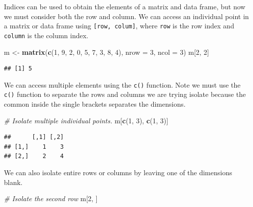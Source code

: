 \documentclass[
]{book}
\newenvironment{Shaded}{\begin{snugshade}}{\end{snugshade}}
\newcommand{\CommentTok}[1]{\textcolor[rgb]{0.56,0.35,0.01}{\textit{#1}}}
\newcommand{\DataTypeTok}[1]{\textcolor[rgb]{0.13,0.29,0.53}{#1}}
\newcommand{\DecValTok}[1]{\textcolor[rgb]{0.00,0.00,0.81}{#1}}
\newcommand{\KeywordTok}[1]{\textcolor[rgb]{0.13,0.29,0.53}{\textbf{#1}}}
\newcommand{\NormalTok}[1]{#1}
\newcommand{\StringTok}[1]{\textcolor[rgb]{0.31,0.60,0.02}{#1}}
\begin{document}
Indices can be used to obtain the elements of a matrix and data frame, but now we must consider both the row and column. We can access an individual point in a matrix or data frame using \texttt{{[}row,\ colum{]}}, where \texttt{row} is the row index and \texttt{column} is the column index.

\begin{Shaded}
\begin{Highlighting}[]
\NormalTok{m <-}\StringTok{ }\KeywordTok{matrix}\NormalTok{(}\KeywordTok{c}\NormalTok{(}\DecValTok{1}\NormalTok{, }\DecValTok{9}\NormalTok{, }\DecValTok{2}\NormalTok{, }\DecValTok{0}\NormalTok{, }\DecValTok{5}\NormalTok{, }\DecValTok{7}\NormalTok{, }\DecValTok{3}\NormalTok{, }\DecValTok{8}\NormalTok{, }\DecValTok{4}\NormalTok{), }\DataTypeTok{nrow =} \DecValTok{3}\NormalTok{, }\DataTypeTok{ncol =} \DecValTok{3}\NormalTok{)}
\NormalTok{m[}\DecValTok{2}\NormalTok{, }\DecValTok{2}\NormalTok{]}
\end{Highlighting}
\end{Shaded}

\begin{verbatim}
## [1] 5
\end{verbatim}

We can access multiple elements using the \texttt{c()} function. Note we must use the \texttt{c()} function to separate the rows and columns we are trying isolate because the common inside the single brackets separates the dimensions.

\begin{Shaded}
\begin{Highlighting}[]
\CommentTok{# Isolate multiple individual points.}
\NormalTok{m[}\KeywordTok{c}\NormalTok{(}\DecValTok{1}\NormalTok{, }\DecValTok{3}\NormalTok{), }\KeywordTok{c}\NormalTok{(}\DecValTok{1}\NormalTok{, }\DecValTok{3}\NormalTok{)]}
\end{Highlighting}
\end{Shaded}

\begin{verbatim}
##      [,1] [,2]
## [1,]    1    3
## [2,]    2    4
\end{verbatim}

We can also isolate entire rows or columns by leaving one of the dimensions blank.

\begin{Shaded}
\begin{Highlighting}[]
\CommentTok{# Isolate the second row}
\NormalTok{m[}\DecValTok{2}\NormalTok{, ]}
\end{Highlighting}
\end{Shaded}
\end{document}
